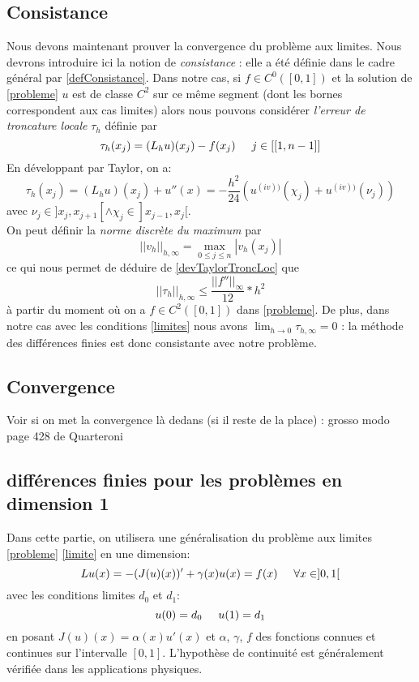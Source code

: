 \documentclass[12pt]{article}
\newcommand{\espace}{\hspace{5mm}}
\begin{document}
\subsection{Consistance}
Nous devons maintenant prouver la convergence du problème aux limites. Nous devrons introduire ici la notion de \emph{consistance} : elle a été définie dans le cadre général par \eqref{defConsistance}. Dans notre cas, si $f \in C^0([0,1])$ et la solution de \eqref{probleme} $u$ est de classe $C^2$ sur ce même segment (dont les bornes correspondent aux cas limites) alors nous pouvons considérer \emph{l'erreur de troncature locale} $\tau_h$ définie par
\begin{equation}\label{erreurTroncatureLocale}
\tau_h(x_j) = (L_h u)(x_j) - f(x_j) \espace j \in [[1,n-1]]
\end{equation}
En développant par Taylor, on a:
\begin{equation}
\tau_h(x_j) = (L_h u)(x_j)  + u''(x) = -\frac{h^2}{24}(u^{(iv))} (\chi_j) + u^{(iv))} (\nu_j))
\end{equation} \label{devTaylorTroncLoc}
avec $\nu_j \in ]x_j, x_{j+1}[ \wedge \chi_j \in ]x_{j-1}, x_j[$.
\\ On peut définir la \emph{norme discrète du maximum} par
\begin{equation} \label{defNormeDiscreteDuMaximum}
|| v_h ||_{h, \infty}  = \max_{0 \le j \le n} |v_h(x_j)|
\end{equation}
ce qui nous permet de déduire de  \eqref{devTaylorTroncLoc} que
\begin{equation}
|| \tau_h ||_{h, \infty} \le \frac{||f''||_\infty}{12} * h^2
\end{equation}
à partir du moment où on a $f \in C^2([0,1])$ dans \eqref{probleme}. De plus, dans notre cas avec les conditions \eqref{limites} nous avons $\lim_{h \rightarrow 0} \tau_{h, \infty} = 0$ : la méthode des différences finies est donc consistante avec notre problème.

\subsection{Convergence}
 Voir si on met la convergence là dedans (si il reste de la place) : grosso modo page 428 de Quarteroni

\subsection{différences finies pour les problèmes en dimension 1}
Dans cette partie, on utilisera une généralisation du problème aux limites \eqref{probleme} \eqref{limite} en une dimension:
\begin{equation}
Lu(x) = -(J(u)(x))' + \gamma (x) u(x)  = f(x) \espace \forall x \in ]0,1[
\end{equation}
avec les conditions limites $d_0$ et $d_1$:
\begin{equation}
u(0) = d_0 \espace u(1) = d_1
\end{equation}
en posant $J(u)(x) = \alpha(x) u'(x)$ et $\alpha$, $\gamma$, $f$ des fonctions connues et continues sur l'intervalle $[0,1]$. L'hypothèse de continuité est généralement vérifiée dans les applications physiques.
\end{document}
